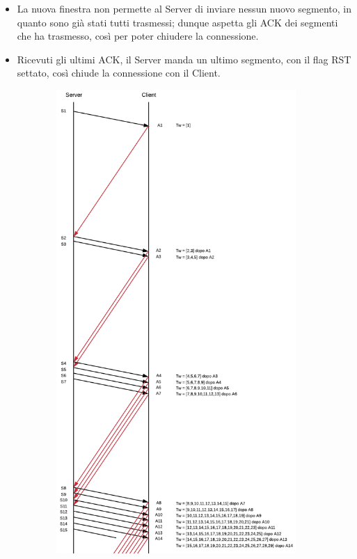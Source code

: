 \documentclass[10pt,a4paper]{article}
\begin{document}
\begin{enumerate}
\begin{itemize}
				\item La nuova finestra non permette al Server di inviare nessun nuovo segmento, in quanto sono già stati tutti trasmessi; dunque aspetta gli ACK dei segmenti che ha trasmesso, così per poter chiudere la connessione.
				\item Ricevuti gli ultimi ACK, il Server manda un ultimo segmento, con il flag RST settato, così chiude la connessione con il Client.
			\end{itemize}
			\newpage
			\begin{figure}[H]
				\begin{subfigure}[b]{9cm}
				  \includegraphics[width=\textwidth]{Esame812019_Conperdite1}

\end{subfigure}
\end{figure}
\end{enumerate}
\end{document}
